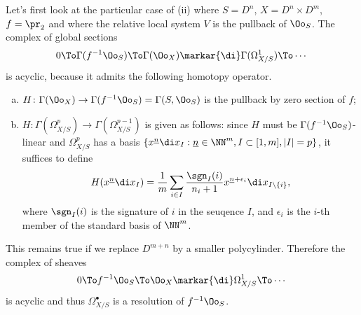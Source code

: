 \begin{subpara}
  Let's first look at the particular case of (ii) where $S=D^n$,
  $X=D^n\times D^m$, $f=\pr_2$ and where the relative local system $V$ is the
  pullback of $\Oo_S$.
  The complex of global sections
  \[
  0\To\Gamma(f^{-1}\Oo_S)\To\Gamma(\Oo_X)\markar{\di}
  \Gamma(\Omega_{X/S}^1)\To\cdots
  \]
  is acyclic, because it admits the following homotopy operator.
  \begin{enumerate}[a)]
    \item $H\colon\Gamma(\Oo_X)\to\Gamma(f^{-1}\Oo_S)=\Gamma(S,\Oo_S)$ is the
    pullback by zero section of $f$;
    \item $H\colon\Gamma(\Omega_{X/S}^p)\to\Gamma(\Omega_{X/S}^{p-1})$ is given
    as follows: since $H$ must be $\Gamma(f^{-1}\Oo_S)$-linear
    and $\Omega_{X/S}^p$ has a basis $\{x^{\underline{n}}\di x_I :
    \underline{n}\in\NN^m,I\subset[1,m],|I|=p\}$, it suffices to define
    \[
    H(x^{\underline{n}}\di x_I)=
    \frac{1}{m}\sum_{i\in I}\frac{\sgn_I(i)}
    {n_i+1}x^{\underline{n}+\epsilon_i}\di x_{I\setminus\{i\}},
    \]
    where $\sgn_I(i)$ is the signature of $i$ in the seuqence $I$,
    and $\epsilon_i$ is the $i$-th member of the standard basis of $\NN^m$.
  \end{enumerate}

  This remains true if we replace $D^{m+n}$ by a smaller polycylinder.
  Therefore the complex of sheaves
  \[
  0\To f^{-1}\Oo_S\To \Oo_X\markar{\di} \Omega_{X/S}^1\To\cdots
  \]
  is acyclic and thus $\Omega_{X/S}^\bullet$ is a resolution of $f^{-1}\Oo_S$.
\end{subpara}
